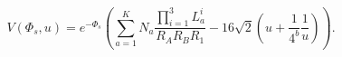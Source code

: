 \begin{equation}
V(\Phi_s,u)=e^{-\Phi_s}
\left(\sum_{a=1}^K  N_a \frac{\prod_{i=1}^3 L^i_a}{R_AR_BR_1}-16\sqrt{2}(u+\frac{1}{4^b}\frac{1}{u})\right).
\label{EqScalarPotential}
\end{equation}


